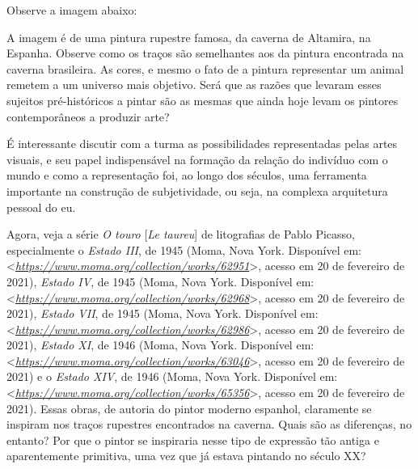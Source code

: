 \documentclass{extarticle}
\begin{document}
Observe a imagem abaixo:


  A imagem é de uma pintura rupestre famosa, da caverna de Altamira, na
  Espanha. Observe como os traços são semelhantes aos da pintura
  encontrada na caverna brasileira. As cores, e mesmo o fato de a
  pintura representar um animal remetem a um universo mais objetivo.
  Será que as razões que levaram esses sujeitos pré-históricos a pintar
  são as mesmas que ainda hoje levam os pintores contemporâneos a
  produzir arte?

  É interessante discutir com a turma as possibilidades representadas
  pelas artes visuais, e seu papel indispensável na formação da relação
  do indivíduo com o mundo e como a representação foi, ao longo dos
  séculos, uma ferramenta importante na construção de subjetividade, ou
  seja, na complexa arquitetura pessoal do eu.

Agora, veja a série \emph{O touro} {[}\emph{Le taureu}{]} de
  litografias de Pablo Picasso, especialmente o \emph{Estado III}, de
  1945 (Moma, Nova York. Disponível em:
  \textless{}\href{https://www.moma.org/collection/works/62951}{\emph{https://www.moma.org/collection/works/62951}}\textgreater{},
  acesso em 20 de fevereiro de 2021), \emph{Estado IV}, de 1945 (Moma,
  Nova York. Disponível em:
  \textless{}\href{https://www.moma.org/collection/works/62968}{\emph{https://www.moma.org/collection/works/62968}}\textgreater{},
  acesso em 20 de fevereiro de 2021), \emph{Estado VII}, de 1945 (Moma,
  Nova York. Disponível em:
  \textless{}\href{https://www.moma.org/collection/works/62986}{\emph{https://www.moma.org/collection/works/62986}}\textgreater{},
  acesso em 20 de fevereiro de 2021), \emph{Estado XI}, de 1946 (Moma,
  Nova York. Disponível em:
  \textless{}\href{https://www.moma.org/collection/works/63046}{\emph{https://www.moma.org/collection/works/63046}}\textgreater{},
  acesso em 20 de fevereiro de 2021) e o \emph{Estado XIV}, de 1946
  (Moma, Nova York. Disponível em:
  \textless{}\href{https://www.moma.org/collection/works/65356}{\emph{https://www.moma.org/collection/works/65356}}\textgreater{},
  acesso em 20 de fevereiro de 2021). Essas obras, de autoria do pintor
  moderno espanhol, claramente se inspiram nos traços rupestres
  encontrados na caverna. Quais são as diferenças, no entanto? Por que o
  pintor se inspiraria nesse tipo de expressão tão antiga e
  aparentemente primitiva, uma vez que já estava pintando no século XX?
\end{document}
